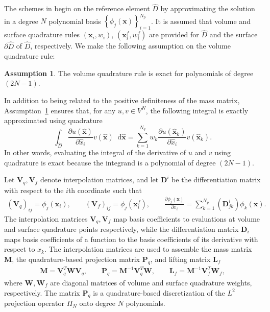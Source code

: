 \documentclass[preprint,10pt]{elsarticle}
\theoremstyle{definition}
\theoremstyle{lemma}
\theoremstyle{corollary}
\theoremstyle{theorem}
\theoremstyle{assumption}
\newtheorem{assumption}{Assumption}
\renewcommand{\hat}[1]{\widehat{#1}}
\newcommand{\pd}[2]{\frac{\partial#1}{\partial#2}}
\newcommand{\LRp}[1]{\left( #1 \right)}
\newcommand{\LRc}[1]{\left\{ #1 \right\}}
\newcommand{\note}[1]{{\color{blue}{#1}}}
\newcommand*\diff[1]{\mathop{}\!{\mathrm{d}#1}}
\begin{document}
The schemes in \cite{chan2017discretely} begin on the reference element $\hat{D}$ by approximating the solution in a degree $N$ polynomial basis $\LRc{\phi_j({\bm{x}})}_{i=1}^{N_p}$.  It is assumed that volume and surface quadrature rules $({\bm{x}}_i, w_i)$, $\LRp{{\bm{x}}^f_i,w^f_i}$ are provided for $\hat{D}$ and the surface $\partial \hat{D}$ of $\hat{D}$, respectively.  We make the following assumption on the volume quadrature rule:
\begin{assumption}
The volume quadrature rule is exact for polynomials of degree $(2N-1)$.
\label{ass:quad}
\end{assumption}
In addition to being related to the positive definiteness of the mass matrix, Assumption~\ref{ass:quad} ensures that, for any $u,v \in V^N$, the following integral is exactly approximated using quadrature
\[
\int_{\hat{D}} \pd{u(\hat{\bm{x}})}{\hat{x}_i} v(\hat{\bm{x}})\diff{\hat{\bm{x}}} = \sum_{k=1}^{N_q} w_k \pd{u(\hat{\bm{x}}_k)}{\hat{x}_i} v(\hat{\bm{x}}_k).  
\]
In other words, evaluating the integral of the derivative of $u$ and $v$ using quadrature is exact because the integrand is a polynomial of degree $(2N-1)$.  

\note{TODO: Standardize hat notation for operators/normals.}

Let $\bm{V}_q,\bm{V}_f$ denote interpolation matrices, and let $\bm{D}^i$ be the differentiation matrix with respect to the $i$th coordinate such that
\begin{gather}
\LRp{\bm{V}_q}_{ij} = \phi_j(\bm{x}_i), \qquad \LRp{\bm{V}_f}_{ij} = \phi_j(\bm{x}^f_i), \qquad \pd{\phi_j(\bm{x})}{x_i} = \sum_{k=1}^{N_p} \LRp{\bm{D}^i_{jk}} \phi_k(\bm{x}).
\end{gather}
The interpolation matrices $\bm{V}_q,\bm{V}_f$ map basis coefficients to evaluations at volume and surface quadrature points respectively, while the differentiation matrix ${\bm{D}}_i$ maps basis coefficients of a function to the basis coefficients of its derivative with respect to $x_k$.  The interpolation matrices are used to assemble the mass matrix $\bm{M}$, the quadrature-based projection matrix $\bm{P}_q$, and lifting matrix $\bm{L}_f$
\begin{gather}
\bm{M} = \bm{V}_q^T\bm{W}\bm{V}_q, \qquad \bm{P}_q = \bm{M}^{-1}\bm{V}_q^T\bm{W}, \qquad \bm{L}_f = \bm{M}^{-1}\bm{V}_f^T\bm{W}_f,
\end{gather}
where $\bm{W}, \bm{W}_f$ are diagonal matrices of volume and surface quadrature weights, respectively.  The matrix $\bm{P}_q$ is a quadrature-based discretization of the $L^2$ projection operator $\Pi_N$ onto degree $N$ polynomials.
\end{document}
